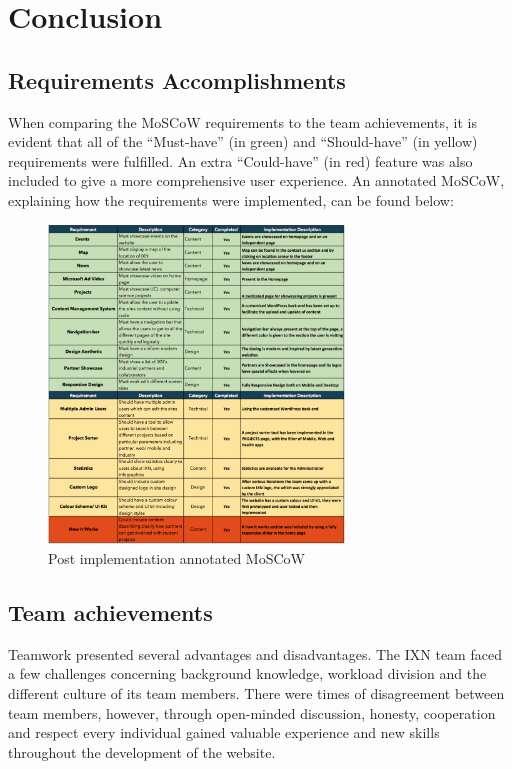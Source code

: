 \documentclass[fontsize=10pt]{extarticle}
\numberwithin{figure}{section} %
\begin{document}
\hypertarget{conclusion}{%
\section{Conclusion}\label{conclusion}}

\hypertarget{requirements-accomplishments}{%
\subsection{Requirements
Accomplishments}\label{requirements-accomplishments}}

When comparing the MoSCoW requirements to the team achievements, it is
evident that all of the ``Must-have'' (in green) and ``Should-have'' (in
yellow) requirements were fulfilled. An extra ``Could-have'' (in red)
feature was also included to give a more comprehensive user experience.
An annotated MoSCoW, explaining how the requirements were implemented,
can be found below:

\begin{figure}[H]
      \centering
      \includegraphics[trim = 0 0 0 0, clip, width=0.7\textwidth]{ph5.png}
      \caption{Post implementation annotated MoSCoW}
 \end{figure}

\hypertarget{team-achievements}{%
\subsection{Team achievements}\label{team-achievements}}

Teamwork presented several advantages and disadvantages. The IXN team
faced a few challenges concerning background knowledge, workload
division and the different culture of its team members. There were times
of disagreement between team members, however, through open-minded
discussion, honesty, cooperation and respect every individual gained
valuable experience and new skills throughout the development of the
website.
\end{document}
